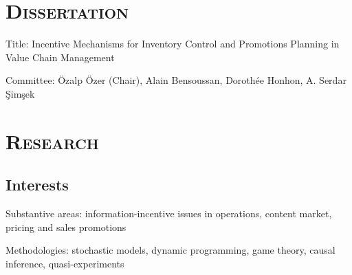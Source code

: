 \documentclass[11pt]{article}
\begin{document}
	\section*{\textsc{Dissertation}}
	\begin{description}
		\item Title: Incentive Mechanisms for Inventory Control and Promotions Planning in Value Chain Management
		\item Committee: \"Ozalp \"Ozer (Chair), Alain Bensoussan, Doroth\'{e}e Honhon, A. Serdar \c{S}im\c{s}ek
			\end{description}


	\section*{\textsc{Research}}

	\subsection*{Interests}

	\begin{description}
			\item Substantive areas: information-incentive issues in operations, content market, pricing and sales promotions

			\item Methodologies:  stochastic models, dynamic programming, game theory, causal inference, quasi-experiments

	\end{description}

\end{document}
